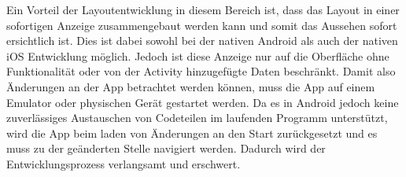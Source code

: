 Ein Vorteil der Layoutentwicklung in diesem Bereich ist, dass das Layout in einer sofortigen Anzeige zusammengebaut werden kann und somit das Aussehen sofort ersichtlich ist. Dies ist dabei sowohl bei der nativen Android als auch der nativen iOS Entwicklung möglich. 
Jedoch ist diese Anzeige nur auf die Oberfläche ohne Funktionalität oder von der Activity hinzugefügte Daten beschränkt. 
Damit also Änderungen an der App betrachtet werden können, muss die App auf einem Emulator oder physischen Gerät gestartet werden.
Da es in Android jedoch keine zuverlässiges Austauschen von Codeteilen im laufenden Programm unterstützt, wird die App beim laden von Änderungen an den Start zurückgesetzt und es muss zu der geänderten Stelle navigiert werden. 
Dadurch wird der Entwicklungsprozess verlangsamt und erschwert.
